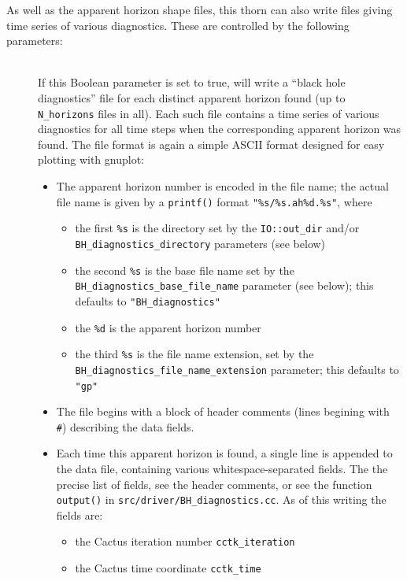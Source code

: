 As well as the apparent horizon shape files, this thorn can also
write files giving time series of various diagnostics.  These are
controlled by the following parameters:

\begin{description}
\item[]
\mbox{}\\
	If this Boolean parameter is set to true,
	 will write a ``black hole diagnostics''
	file for each distinct apparent horizon found
	(up to \verb|N_horizons| files in all).  Each such file
	contains a time series of various diagnostics for all time
	steps when the corresponding apparent horizon was found.
	The file format is again a simple ASCII format designed
	for easy plotting with gnuplot:
	\begin{itemize}
	\item	The apparent horizon number is encoded in the file name;
		the actual file name is given by a \verb|printf()| format
		\verb|"%s/%s.ah%d.%s"|, where
		\begin{itemize}
		\item	the first \verb|%s| is the directory
			set by the \verb|IO::out_dir| and/or
			\verb|BH_diagnostics_directory| parameters (see below)
		\item	the second \verb|%s| is the base file name
			set by the \verb|BH_diagnostics_base_file_name|
			parameter (see below); this defaults to
			\verb|"BH_diagnostics"|
		\item	the \verb|%d| is the apparent horizon number
		\item	the third \verb|%s| is the file name extension,
			set by the \verb|BH_diagnostics_file_name_extension|
			parameter; this defaults to \verb|"gp"|
		\end{itemize}
	\item	The file begins with a block of header comments
		(lines begining with \verb|#|) describing the data
		fields.
	\item	Each time this apparent horizon is found, a single
		line is appended to the data file, containing various
		whitespace-separated fields.  The the precise list of
		fields, see the header comments, or see the function
		\verb|output()| in \verb|src/driver/BH_diagnostics.cc|.
		As of this writing the fields are:
		\begin{itemize}
		\item	the Cactus iteration number \verb|cctk_iteration|
		\item	the Cactus time coordinate \verb|cctk_time|

\end{itemize}
\end{itemize}
\end{description}
